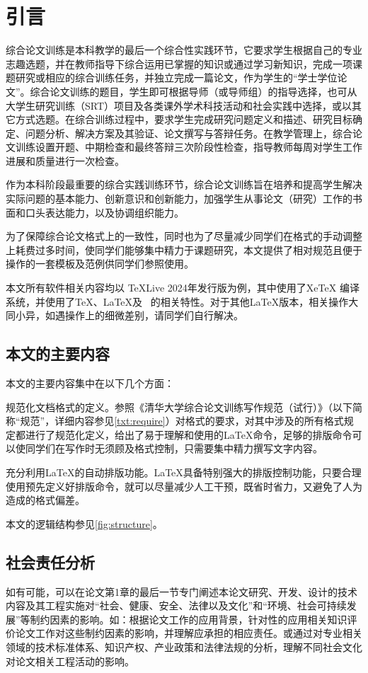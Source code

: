 \documentclass{Diploma}
\begin{document}
\chapter[preface]{引言}
综合论文训练是本科教学的最后一个综合性实践环节，它要求学生根据自己的专业志趣选题，并在教师指导下综合运用已掌握的知识或通过学习新知识，完成一项课题研究或相应的综合训练任务，并独立完成一篇论文，作为学生的“学士学位论文”。综合论文训练的题目，学生即可根据导师（或导师组）的指导选择，也可从大学生研究训练（SRT）项目及各类课外学术科技活动和社会实践中选择，或以其它方式选题。在综合训练过程中，要求学生完成研究问题定义和描述、研究目标确定、问题分析、解决方案及其验证、论文撰写与答辩任务。在教学管理上，综合论文训练设置开题、中期检查和最终答辩三次阶段性检查，指导教师每周对学生工作进展和质量进行一次检查。

作为本科阶段最重要的综合实践训练环节，综合论文训练旨在培养和提高学生解决实际问题的基本能力、创新意识和创新能力，加强学生从事论文（研究）工作的书面和口头表达能力，以及协调组织能力。

为了保障综合论文格式上的一致性，同时也为了尽量减少同学们在格式的手动调整上耗费过多时间，使同学们能够集中精力于课题研究，本文提供了相对规范且便于操作的一套模板及范例供同学们参照使用。

本文所有软件相关内容均以 TeXLive 2024年发行版为例，其中使用了XeTeX 编译系统，并使用了\TeX、\LaTeX 及 \LaTeXe\ 的相关特性。对于其他\LaTeX 版本，相关操作大同小异，如遇操作上的细微差别，请同学们自行解决。

\section{本文的主要内容}
本文的主要内容集中在以下几个方面：

规范化文档格式的定义。参照《清华大学综合论文训练写作规范（试行）》（以下简称“规范”，详细内容参见\ref{txt:require}）对格式的要求，对其中涉及的所有格式规定都进行了规范化定义，给出了易于理解和使用的\LaTeX 命令，足够的排版命令可以使同学们在写作时无须顾及格式控制，只需要集中精力撰写文字内容。

充分利用\LaTeX 的自动排版功能。\LaTeX 具备特别强大的排版控制功能，只要合理使用预先定义好排版命令，就可以尽量减少人工干预，既省时省力，又避免了人为造成的格式偏差。

本文的逻辑结构参见\ref{fig:structure}。
%

\section{社会责任分析}
如有可能，可以在论文第1章的最后一节专门阐述本论文研究、开发、设计的技术内容及其工程实施对“社会、健康、安全、法律以及文化”和“环境、社会可持续发展”等制约因素的影响。如：根据论文工作的应用背景，针对性的应用相关知识评价论文工作对这些制约因素的影响，并理解应承担的相应责任。或通过对专业相关领域的技术标准体系、知识产权、产业政策和法律法规的分析，理解不同社会文化对论文相关工程活动的影响。
\end{document}
